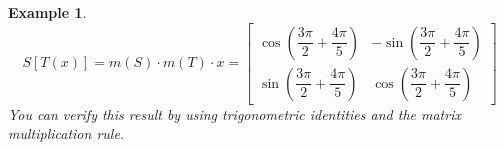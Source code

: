 \documentclass{book}
\newtheorem{example}{Example}[section]
\begin{document}
\begin{example}
    \begin{equation*}
            S\left[T(x)\right] = m(S)\cdot m(T) \cdot x =
            \left[\begin{matrix}
                \cos\left(\dfrac{3\pi}{2} + \dfrac{4\pi}{5}\right) & -\sin\left(\dfrac{3\pi}{2} + \dfrac{4\pi}{5}\right)\\[1.5em]
                \sin\left(\dfrac{3\pi}{2} + \dfrac{4\pi}{5}\right) & \cos\left(\dfrac{3\pi}{2} + \dfrac{4\pi}{5}\right) 
            \end{matrix}\right]
    \end{equation*}
    You can verify this result by using trigonometric identities and the matrix multiplication 
    rule.
\end{example}
\end{document}
